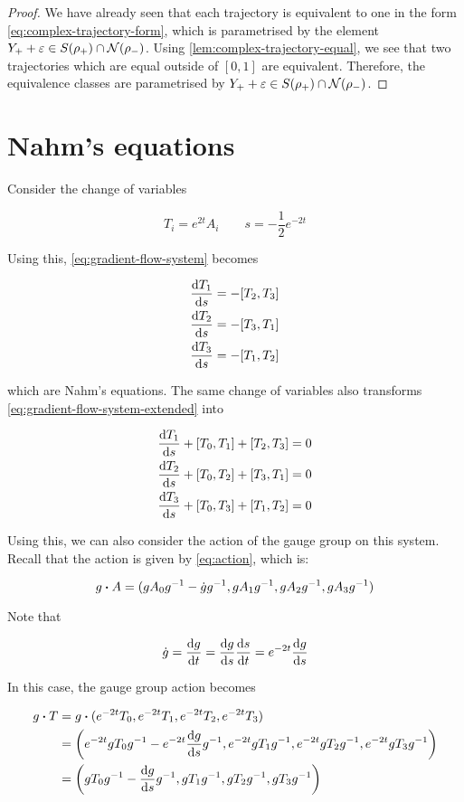 \documentclass{article}
\begin{document}
\begin{proof}
    We have already seen that each trajectory is equivalent to one in the form \cref{eq:complex-trajectory-form}, which is parametrised by the element \(Y_+ + \varepsilon \in S(\rho_+) \cap \mathcal{N}(\rho_-)\). Using \cref{lem:complex-trajectory-equal}, we see that two trajectories which are equal outside of \([0, 1]\) are equivalent. Therefore, the equivalence classes are parametrised by \(Y_+ + \varepsilon \in S(\rho_+) \cap \mathcal{N}(\rho_-)\).
\end{proof}

\section{Nahm's equations}

\label{sec:nahm}

Consider the change of variables

\[T_i = e^{2t}A_i \qquad s = -\frac12e^{-2t}\]

Using this, \cref{eq:gradient-flow-system} becomes

\begin{align*}
    \dv{T_1}{s} &= -[T_2, T_3] \\
    \dv{T_2}{s} &= -[T_3, T_1] \\
    \dv{T_3}{s} &= -[T_1, T_2]
\end{align*}

which are Nahm's equations. The same change of variables also transforms \cref{eq:gradient-flow-system-extended} into 

\begin{align*}
    \dv{T_1}{s} + [T_0, T_1] + [T_2, T_3] &= 0 \\
    \dv{T_2}{s} + [T_0, T_2] + [T_3, T_1] &= 0 \\
    \dv{T_3}{s} + [T_0, T_3] + [T_1, T_2] &= 0 \\
\end{align*}

Using this, we can also consider the action of the gauge group on this system. Recall that the action is given by \cref{eq:action}, which is:

\[g \vdot A = (gA_0g^{-1} - \dot g g^{-1}, gA_1g^{-1}, gA_2g^{-1}, gA_3g^{-1})\]

Note that

\[\dot g = \dv{g}{t} = \dv{g}{s}\dv{s}{t} = e^{-2t}\dv{g}{s}\]

In this case, the gauge group action becomes

\begin{align*}
    g \vdot T &= g \vdot (e^{-2t}T_0, e^{-2t}T_1, e^{-2t}T_2, e^{-2t}T_3) \\
    &= \left(e^{-2t}gT_0g^{-1} - e^{-2t}\dv{g}{s} g^{-1}, e^{-2t}gT_1g^{-1}, e^{-2t}gT_2g^{-1}, e^{-2t}gT_3g^{-1}\right) \\
    &= \left(gT_0g^{-1} - \dv{g}{s}g^{-1}, gT_1g^{-1}, gT_2g^{-1}, gT_3g^{-1}\right)
\end{align*}
\end{document}
